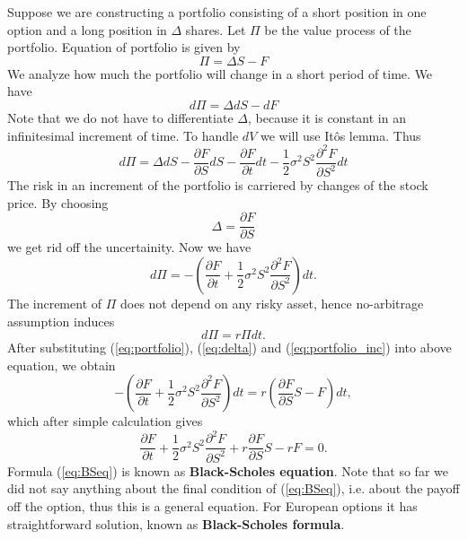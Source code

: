 \documentclass[a4paper,12pt, oneside]{book}
\theoremstyle{definition}
\theoremstyle{remark}
\begin{document}
Suppose we are constructing a portfolio consisting of a short position in one option and a long position in $\Delta$ shares. Let $\Pi$ be the value process of the portfolio. Equation of portfolio is given by
\begin{equation}
 \label{eq:portfolio}
  \Pi = \Delta S - F 
\end{equation}
We analyze how much the portfolio will change in a short period of time. We have
\[ d\Pi = \Delta dS - dF  \]
Note that we do not have to differentiate $\Delta$, because it is constant in an infinitesimal increment of time. To handle $dV$ we will use It\^{o}s lemma. Thus
\[ d\Pi = \Delta dS - \frac{\partial F}{\partial S}dS - \frac{\partial F}{\partial t}dt - \frac{1}{2}\sigma^2 S^2 \frac{\partial^2 F}{\partial S^2}dt  \]
The risk in an increment of the portfolio is carriered by changes of the stock price. By choosing
\begin{equation}
 \label{eq:delta}
 \Delta = \frac{\partial F}{\partial S}
\end{equation}
we get rid off the uncertainity. Now we have
\begin{equation}
  \label{eq:portfolio_inc}
 d\Pi = -(\frac{\partial F}{\partial t} + \frac{1}{2}\sigma^2 S^2 \frac{\partial^2 F}{\partial S^2})dt.
\end{equation}
The increment of $\Pi$ does not depend on any risky asset, hence no-arbitrage assumption induces
\[ d\Pi = r\Pi dt. \]
After substituting (\ref{eq:portfolio}), (\ref{eq:delta}) and (\ref{eq:portfolio_inc}) into above equation, we obtain
\[ -(\frac{\partial F}{\partial t} + \frac{1}{2}\sigma^2 S^2 \frac{\partial^2 F}{\partial S^2})dt = r(\frac{\partial F}{\partial S} S - F)dt, \]
which after simple calculation gives
\begin{equation}
 \label{eq:BSeq}
 \frac{\partial F}{\partial t} + \frac{1}{2}\sigma^2 S^2 \frac{\partial^2 F}{\partial S^2} + r\frac{\partial F}{\partial S} S - rF = 0.
\end{equation}
Formula (\ref{eq:BSeq}) is known as \textbf{Black-Scholes equation}. Note that so far we did not say anything about the final condition of (\ref{eq:BSeq}), i.e. about the payoff off the option, thus this is a general equation. For European options it has straightforward solution, known as \textbf{Black-Scholes formula}.
\end{document}

